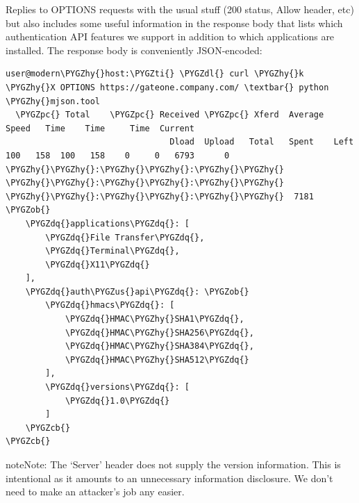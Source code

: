 \documentclass[letterpaper,10pt,openany]{sphinxmanual}
\def\PYGZus{\char`\_}
\def\PYGZob{\char`\{}
\def\PYGZcb{\char`\}}
\def\PYGZpc{\char`\%}
\def\PYGZdl{\char`\$}
\def\PYGZhy{\char`\-}
\def\PYGZdq{\char`\"}
\def\PYGZti{\char`\~}
\begin{document}
\begin{fulllineitems}
\begin{fulllineitems}
\label{Developer/server:gateone.core.server.BaseHandler.options}
Replies to OPTIONS requests with the usual stuff (200 status, Allow
header, etc) but also includes some useful information in the response
body that lists which authentication API features we support in
addition to which applications are installed.  The response body is
conveniently JSON-encoded:

\begin{Verbatim}[commandchars=\\\{\}]
user@modern\PYGZhy{}host:\PYGZti{} \PYGZdl{} curl \PYGZhy{}k             \PYGZhy{}X OPTIONS https://gateone.company.com/ \textbar{} python \PYGZhy{}mjson.tool
  \PYGZpc{} Total    \PYGZpc{} Received \PYGZpc{} Xferd  Average Speed   Time    Time     Time  Current
                                 Dload  Upload   Total   Spent    Left  Speed
100   158  100   158    0     0   6793      0 \PYGZhy{}\PYGZhy{}:\PYGZhy{}\PYGZhy{}:\PYGZhy{}\PYGZhy{} \PYGZhy{}\PYGZhy{}:\PYGZhy{}\PYGZhy{}:\PYGZhy{}\PYGZhy{} \PYGZhy{}\PYGZhy{}:\PYGZhy{}\PYGZhy{}:\PYGZhy{}\PYGZhy{}  7181
\PYGZob{}
    \PYGZdq{}applications\PYGZdq{}: [
        \PYGZdq{}File Transfer\PYGZdq{},
        \PYGZdq{}Terminal\PYGZdq{},
        \PYGZdq{}X11\PYGZdq{}
    ],
    \PYGZdq{}auth\PYGZus{}api\PYGZdq{}: \PYGZob{}
        \PYGZdq{}hmacs\PYGZdq{}: [
            \PYGZdq{}HMAC\PYGZhy{}SHA1\PYGZdq{},
            \PYGZdq{}HMAC\PYGZhy{}SHA256\PYGZdq{},
            \PYGZdq{}HMAC\PYGZhy{}SHA384\PYGZdq{},
            \PYGZdq{}HMAC\PYGZhy{}SHA512\PYGZdq{}
        ],
        \PYGZdq{}versions\PYGZdq{}: [
            \PYGZdq{}1.0\PYGZdq{}
        ]
    \PYGZcb{}
\PYGZcb{}
\end{Verbatim}

\begin{notice}{note}{Note:}
The `Server' header does not supply the version information.  This
is intentional as it amounts to an unnecessary information
disclosure.  We don't need to make an attacker's job any easier.
\end{notice}

\end{fulllineitems}


\end{fulllineitems}

\end{document}
